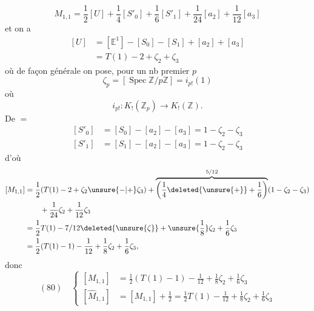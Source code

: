 \[
M_{1,1}=\frac12[U]+\frac14[S'_0]+\frac16[S'_1]+\frac1{24}[a_2]+\frac1{12}[a_3]
\]
et on a
\[
\begin{aligned}
[U]&=[\mathbb E^1]-[S_0]-[S_1]+[a_2]+[a_3]\\
&=T(1)-2+\zeta_2+\zeta_3
\end{aligned}
\]
où de façon générale on pose, pour un nb premier $p$
\[
\zeta_p=[\operatorname{Spec}\mathbb Z/p\mathbb Z]=i_{p!}(1)
\]
où
\[
i_{p!}:K_!(\mathbb Z_p)\longrightarrow K_!(\mathbb Z).
\]
De $=$
\[
\begin{aligned}
[S'_0]&=[S_0]-[a_2]-[a_3]=1-\zeta_2-\zeta_3\\
[S'_1]&=[S_1]-[a_2]-[a_3]=1-\zeta_2-\zeta_3
\end{aligned}
\]
d'où
\[
\begin{aligned}
[M_{1,1}]&=\frac12(T(1)-2+\zeta_2\unsure{-|+}\zeta_3)+\overbrace{\left(\frac14\deleted{\unsure{+}}+\frac16\right)}^{5/12}(1-\zeta_2-\zeta_3)\\
&\qquad+\frac1{24}\zeta_2+\frac1{12}\zeta_3\\
&=\frac12T(1)-7/12\deleted{\unsure{\zeta}}+\unsure{\frac18}\zeta_2+\frac16\zeta_3\\
&=\frac12(T(1)-1)-\frac1{12}+\frac18\zeta_2+\frac16\zeta_3,
\end{aligned}
\]
donc
\[
(80)\quad\left\{\begin{aligned}
[M_{1,1}]&=\frac12(T(1)-1)-\frac1{12}+\frac18\zeta_2+\frac16\zeta_3\\
[\widehat M_{1,1}]&=[M_{1,1}]+\frac12=\frac12T(1)-\frac1{12}+\frac18\zeta_2+\frac16\zeta_3
\end{aligned}\right.
\]

